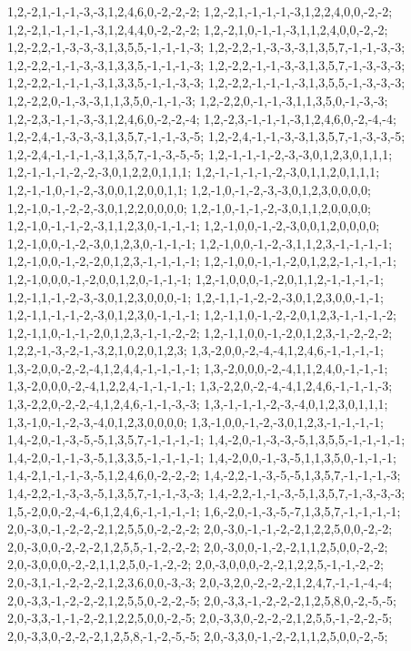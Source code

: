 {{1,2,-2,1,-1,-1,-3,-3,1,2,4,6,0,-2,-2,-2; 1,2,-2,1,-1,-1,-1,-3,1,2,2,4,0,0,-2,-2; 1,2,-2,1,-1,-1,-1,-3,1,2,4,4,0,-2,-2,-2; 1,2,-2,1,0,-1,-1,-3,1,1,2,4,0,0,-2,-2; 1,2,-2,2,-1,-3,-3,-3,1,3,5,5,-1,-1,-1,-3; 1,2,-2,2,-1,-3,-3,-3,1,3,5,7,-1,-1,-3,-3; 1,2,-2,2,-1,-1,-3,-3,1,3,3,5,-1,-1,-1,-3; 1,2,-2,2,-1,-1,-3,-3,1,3,5,7,-1,-3,-3,-3; 1,2,-2,2,-1,-1,-1,-3,1,3,3,5,-1,-1,-3,-3; 1,2,-2,2,-1,-1,-1,-3,1,3,5,5,-1,-3,-3,-3; 1,2,-2,2,0,-1,-3,-3,1,1,3,5,0,-1,-1,-3; 1,2,-2,2,0,-1,-1,-3,1,1,3,5,0,-1,-3,-3;
1,2,-2,3,-1,-1,-3,-3,1,2,4,6,0,-2,-2,-4; 1,2,-2,3,-1,-1,-1,-3,1,2,4,6,0,-2,-4,-4; 1,2,-2,4,-1,-3,-3,-3,1,3,5,7,-1,-1,-3,-5; 1,2,-2,4,-1,-1,-3,-3,1,3,5,7,-1,-3,-3,-5; 1,2,-2,4,-1,-1,-1,-3,1,3,5,7,-1,-3,-5,-5; 1,2,-1,-1,-1,-2,-3,-3,0,1,2,3,0,1,1,1; 1,2,-1,-1,-1,-2,-2,-3,0,1,2,2,0,1,1,1; 1,2,-1,-1,-1,-1,-2,-3,0,1,1,2,0,1,1,1; 1,2,-1,-1,0,-1,-2,-3,0,0,1,2,0,0,1,1; 1,2,-1,0,-1,-2,-3,-3,0,1,2,3,0,0,0,0; 1,2,-1,0,-1,-2,-2,-3,0,1,2,2,0,0,0,0; 1,2,-1,0,-1,-1,-2,-3,0,1,1,2,0,0,0,0;
1,2,-1,0,-1,-1,-2,-3,1,1,2,3,0,-1,-1,-1; 1,2,-1,0,0,-1,-2,-3,0,0,1,2,0,0,0,0; 1,2,-1,0,0,-1,-2,-3,0,1,2,3,0,-1,-1,-1; 1,2,-1,0,0,-1,-2,-3,1,1,2,3,-1,-1,-1,-1; 1,2,-1,0,0,-1,-2,-2,0,1,2,3,-1,-1,-1,-1; 1,2,-1,0,0,-1,-1,-2,0,1,2,2,-1,-1,-1,-1; 1,2,-1,0,0,0,-1,-2,0,0,1,2,0,-1,-1,-1; 1,2,-1,0,0,0,-1,-2,0,1,1,2,-1,-1,-1,-1; 1,2,-1,1,-1,-2,-3,-3,0,1,2,3,0,0,0,-1; 1,2,-1,1,-1,-2,-2,-3,0,1,2,3,0,0,-1,-1; 1,2,-1,1,-1,-1,-2,-3,0,1,2,3,0,-1,-1,-1; 1,2,-1,1,0,-1,-2,-2,0,1,2,3,-1,-1,-1,-2;
1,2,-1,1,0,-1,-1,-2,0,1,2,3,-1,-1,-2,-2; 1,2,-1,1,0,0,-1,-2,0,1,2,3,-1,-2,-2,-2; 1,2,2,-1,-3,-2,-1,-3,2,1,0,2,0,1,2,3; 1,3,-2,0,0,-2,-4,-4,1,2,4,6,-1,-1,-1,-1; 1,3,-2,0,0,-2,-2,-4,1,2,4,4,-1,-1,-1,-1; 1,3,-2,0,0,0,-2,-4,1,1,2,4,0,-1,-1,-1; 1,3,-2,0,0,0,-2,-4,1,2,2,4,-1,-1,-1,-1; 1,3,-2,2,0,-2,-4,-4,1,2,4,6,-1,-1,-1,-3; 1,3,-2,2,0,-2,-2,-4,1,2,4,6,-1,-1,-3,-3; 1,3,-1,-1,-1,-2,-3,-4,0,1,2,3,0,1,1,1; 1,3,-1,0,-1,-2,-3,-4,0,1,2,3,0,0,0,0; 1,3,-1,0,0,-1,-2,-3,0,1,2,3,-1,-1,-1,-1;
1,4,-2,0,-1,-3,-5,-5,1,3,5,7,-1,-1,-1,-1; 1,4,-2,0,-1,-3,-3,-5,1,3,5,5,-1,-1,-1,-1; 1,4,-2,0,-1,-1,-3,-5,1,3,3,5,-1,-1,-1,-1; 1,4,-2,0,0,-1,-3,-5,1,1,3,5,0,-1,-1,-1; 1,4,-2,1,-1,-1,-3,-5,1,2,4,6,0,-2,-2,-2; 1,4,-2,2,-1,-3,-5,-5,1,3,5,7,-1,-1,-1,-3; 1,4,-2,2,-1,-3,-3,-5,1,3,5,7,-1,-1,-3,-3; 1,4,-2,2,-1,-1,-3,-5,1,3,5,7,-1,-3,-3,-3; 1,5,-2,0,0,-2,-4,-6,1,2,4,6,-1,-1,-1,-1; 1,6,-2,0,-1,-3,-5,-7,1,3,5,7,-1,-1,-1,-1; 2,0,-3,0,-1,-2,-2,-2,1,2,5,5,0,-2,-2,-2; 2,0,-3,0,-1,-1,-2,-2,1,2,2,5,0,0,-2,-2;
2,0,-3,0,0,-2,-2,-2,1,2,5,5,-1,-2,-2,-2; 2,0,-3,0,0,-1,-2,-2,1,1,2,5,0,0,-2,-2; 2,0,-3,0,0,0,-2,-2,1,1,2,5,0,-1,-2,-2; 2,0,-3,0,0,0,-2,-2,1,2,2,5,-1,-1,-2,-2; 2,0,-3,1,-1,-2,-2,-2,1,2,3,6,0,0,-3,-3; 2,0,-3,2,0,-2,-2,-2,1,2,4,7,-1,-1,-4,-4; 2,0,-3,3,-1,-2,-2,-2,1,2,5,5,0,-2,-2,-5; 2,0,-3,3,-1,-2,-2,-2,1,2,5,8,0,-2,-5,-5; 2,0,-3,3,-1,-1,-2,-2,1,2,2,5,0,0,-2,-5; 2,0,-3,3,0,-2,-2,-2,1,2,5,5,-1,-2,-2,-5; 2,0,-3,3,0,-2,-2,-2,1,2,5,8,-1,-2,-5,-5; 2,0,-3,3,0,-1,-2,-2,1,1,2,5,0,0,-2,-5;
}}
